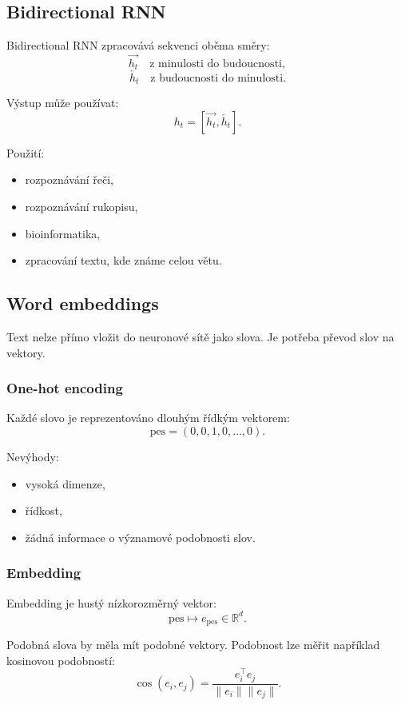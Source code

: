 \subsection{Bidirectional RNN}

Bidirectional RNN zpracovává sekvenci oběma směry:
\[
\overrightarrow{h_t}
\quad \text{z minulosti do budoucnosti},
\]
\[
\overleftarrow{h_t}
\quad \text{z budoucnosti do minulosti}.
\]

Výstup může používat:
\[
h_t =
[\overrightarrow{h_t},\overleftarrow{h_t}].
\]

Použití:
\begin{itemize}
    \item rozpoznávání řeči,
    \item rozpoznávání rukopisu,
    \item bioinformatika,
    \item zpracování textu, kde známe celou větu.
\end{itemize}

\subsection{Word embeddings}

Text nelze přímo vložit do neuronové sítě jako slova. Je potřeba převod slov na vektory.

\subsubsection{One-hot encoding}

Každé slovo je reprezentováno dlouhým řídkým vektorem:
\[
\text{pes} = (0,0,1,0,\ldots,0).
\]

Nevýhody:
\begin{itemize}
    \item vysoká dimenze,
    \item řídkost,
    \item žádná informace o významové podobnosti slov.
\end{itemize}

\subsubsection{Embedding}

Embedding je hustý nízkorozměrný vektor:
\[
\text{pes} \mapsto e_{\text{pes}}\in \mathbb{R}^d.
\]

Podobná slova by měla mít podobné vektory. Podobnost lze měřit například kosinovou podobností:
\[
\cos(e_i,e_j)=
\frac{e_i^\top e_j}
{\|e_i\|\|e_j\|}.
\]

